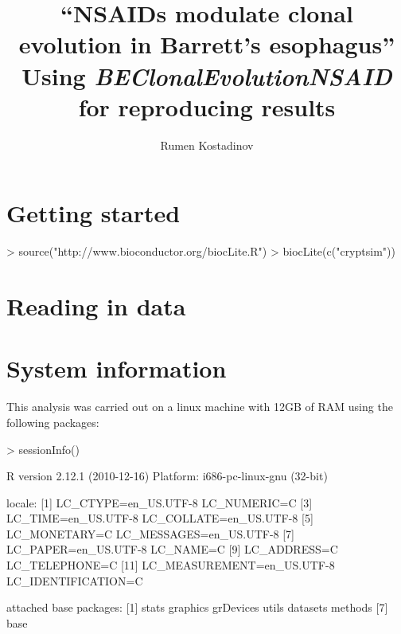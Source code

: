 \documentclass[12pt]{article}
\newcommand{\Rpackage}[1]{{\textit{#1}}}
\begin{document}

\title{``NSAIDs modulate clonal evolution in Barrett's esophagus'' \\Using \Rpackage{BEClonalEvolutionNSAID} for reproducing results}
\author{Rumen Kostadinov}
\maketitle

\section{Getting started}

\begin{Schunk}
\begin{Sinput}
> source("http://www.bioconductor.org/biocLite.R")
> biocLite(c("cryptsim"))
\end{Sinput}
\end{Schunk}


\section{Reading in data}



\section{System information}

This analysis was carried out on a linux machine with 12GB of RAM
using the following packages:

\begin{Schunk}
\begin{Sinput}
> sessionInfo()
\end{Sinput}
\begin{Soutput}
R version 2.12.1 (2010-12-16)
Platform: i686-pc-linux-gnu (32-bit)

locale:
 [1] LC_CTYPE=en_US.UTF-8       LC_NUMERIC=C              
 [3] LC_TIME=en_US.UTF-8        LC_COLLATE=en_US.UTF-8    
 [5] LC_MONETARY=C              LC_MESSAGES=en_US.UTF-8   
 [7] LC_PAPER=en_US.UTF-8       LC_NAME=C                 
 [9] LC_ADDRESS=C               LC_TELEPHONE=C            
[11] LC_MEASUREMENT=en_US.UTF-8 LC_IDENTIFICATION=C       

attached base packages:
[1] stats     graphics  grDevices utils     datasets  methods  
[7] base     
\end{Soutput}
\end{Schunk}
\end{document}
